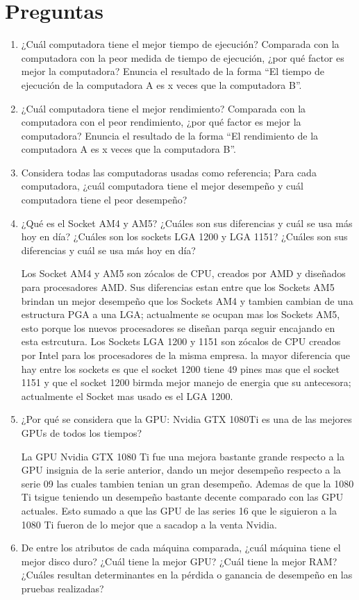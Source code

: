 \documentclass[12pt]{article}
\begin{document}
\section{Preguntas}
\begin{enumerate}[label=(\arabic{section}.\arabic{subsection}.\arabic{enumi})]
    \item ¿Cuál computadora tiene el mejor tiempo de ejecución? Comparada con la computadora con la peor medida de tiempo de ejecución, ¿por qué factor es mejor la computadora? Enuncia el resultado de la forma “El tiempo de ejecución de la computadora A es x veces que la computadora B”.
    
    \item ¿Cuál computadora tiene el mejor rendimiento? Comparada con la computadora con el peor rendimiento, ¿por qué factor es mejor la computadora? Enuncia el resultado de la forma “El rendimiento de la computadora A es x veces que la computadora B”.

    \item Considera todas las computadoras usadas como referencia; Para cada computadora, ¿cuál computadora tiene el mejor desempeño y cuál computadora tiene el peor desempeño?

    \item ¿Qué es el Socket AM4 y AM5? ¿Cuáles son sus diferencias y cuál se usa más hoy en día? ¿Cuáles son los sockets LGA 1200 y LGA 1151? ¿Cuáles son sus diferencias y cuál se usa más hoy en día?
    
    Los Socket AM4 y AM5 son zócalos de CPU, creados por AMD y diseñados para procesadores AMD. Sus diferencias estan entre que los Sockets AM5 brindan un mejor desempeño que los Sockets AM4 y tambien cambian de una estructura PGA a una LGA; actualmente se ocupan mas los Sockets AM5, esto porque los nuevos procesadores se diseñan parqa seguir encajando en esta estrcutura. Los Sockets LGA 1200 y 1151 son zócalos de CPU creados por Intel para los procesadores de la misma empresa. la mayor diferencia que hay entre los sockets es que el socket 1200 tiene 49 pines mas que el socket 1151 y que el socket 1200 birmda mejor manejo de energia que su antecesora; actualmente el Socket mas usado es el LGA 1200.

    \item ¿Por qué se considera que la GPU: Nvidia GTX 1080Ti es una de las mejores GPUs de todos los tiempos?
    
    La GPU Nvidia GTX 1080 Ti fue una mejora bastante grande respecto a la GPU insignia de la serie anterior, dando un mejor desempeño respecto a la serie 09 las cuales tambien tenian un gran desempeño. Ademas de que la 1080 Ti tsigue teniendo un desempeño bastante decente comparado con las GPU actuales. Esto sumado a que las GPU de las series 16 que le siguieron a la 1080 Ti fueron de lo mejor que a sacadop a la venta Nvidia.

    \item De entre los atributos de cada máquina comparada, ¿cuál máquina tiene el mejor disco duro? ¿Cuál tiene la mejor GPU? ¿Cuál tiene la mejor RAM? ¿Cuáles resultan determinantes en la pérdida o ganancia de desempeño en las pruebas realizadas?
\end{enumerate}
\end{document}
